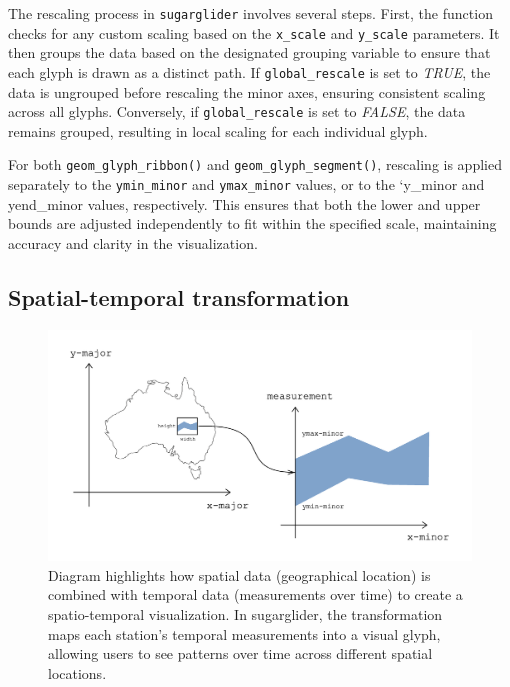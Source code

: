 The rescaling process in \texttt{sugarglider} involves several steps. First, the function checks for any custom scaling based on the \texttt{x\_scale} and \texttt{y\_scale} parameters. It then groups the data based on the designated grouping variable to ensure that each glyph is drawn as a distinct path. If \texttt{global\_rescale} is set to \emph{TRUE}, the data is ungrouped before rescaling the minor axes, ensuring consistent scaling across all glyphs. Conversely, if \texttt{global\_rescale} is set to \emph{FALSE}, the data remains grouped, resulting in local scaling for each individual glyph.

For both \texttt{geom\_glyph\_ribbon()} and \texttt{geom\_glyph\_segment()}, rescaling is applied separately to the \texttt{ymin\_minor} and \texttt{ymax\_minor} values, or to the `y\_minor and yend\_minor values, respectively. This ensures that both the lower and upper bounds are adjusted independently to fit within the specified scale, maintaining accuracy and clarity in the visualization.

\hypertarget{spatial-temporal-transformation}{%
\subsection{Spatial-temporal transformation}\label{spatial-temporal-transformation}}

\begin{figure}
\includegraphics[width=17.71in]{figures/diagram-transformation} \caption{Diagram highlights how spatial data (geographical location) is combined with temporal data (measurements over time) to create a spatio-temporal visualization. In sugarglider, the transformation maps each station's temporal measurements into a visual glyph, allowing users to see patterns over time across different spatial locations.}\label{fig:unnamed-chunk-7}
\end{figure}

